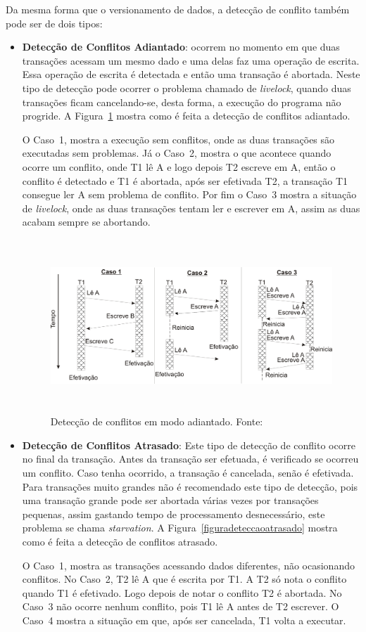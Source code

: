 \documentclass[ti]{texufpel} %
\begin{document}
Da mesma forma que o versionamento de dados, a detecção de conflito também pode ser de dois tipos:

\begin{itemize}
 \item \textbf{Detecção de Conflitos Adiantado}: ocorrem no momento em que duas transações acessam um mesmo dado e uma delas faz uma operação de escrita. Essa operação de escrita é detectada e então uma transação é abortada. Neste tipo de detecção pode ocorrer o problema chamado de \emph{livelock}, quando duas transações ficam cancelando-se, desta forma, a execução do programa não progride. A Figura~\ref{figuradeteccaoadiantado} mostra como é feita a detecção de conflitos adiantado.

 O Caso~1, mostra a execução sem conflitos, onde as duas transações são executadas sem problemas. Já o Caso~2, mostra o que acontece quando ocorre um conflito, onde T1 lê A e logo depois T2 escreve em A, então o conflito é detectado e T1 é abortada, após ser efetivada T2, a transação T1 consegue ler A sem problema de conflito. Por fim o Caso~3 mostra a situação de \emph{livelock}, onde as duas transações tentam ler e escrever em A, assim as duas acabam sempre se abortando.

\begin{figure}[!htp]
\centering
\includegraphics[height=6.5cm]{Imagens/conflitoadiantado.png}
\caption{Detecção de conflitos em modo adiantado. Fonte:~\cite{rigo07}}
\label{figuradeteccaoadiantado}
\end{figure}

 \item \textbf{Detecção de Conflitos Atrasado}: Este tipo de detecção de conflito ocorre no final da transação.  Antes da transação ser efetuada, é verificado se ocorreu um conflito. Caso tenha ocorrido, a transação é cancelada, senão é efetivada. Para transações muito grandes não é recomendado este tipo de detecção, pois uma transação grande pode ser abortada várias vezes por transações pequenas, assim gastando tempo de processamento desnecessário, este problema se chama \emph{starvation}. A Figura~\ref{figuradeteccaoatrasado} mostra como é feita a detecção de conflitos atrasado.

 O Caso~1, mostra as transações acessando dados diferentes, não ocasionando conflitos. No Caso~2, T2 lê A que é escrita por T1. A T2 só nota o conflito quando T1 é efetivado. Logo depois de notar o conflito T2 é abortada. No Caso~3 não ocorre nenhum conflito, pois T1 lê A antes de T2 escrever. O Caso~4 mostra a situação em que, após ser cancelada, T1 volta a executar.
\end{itemize}
\end{document}
